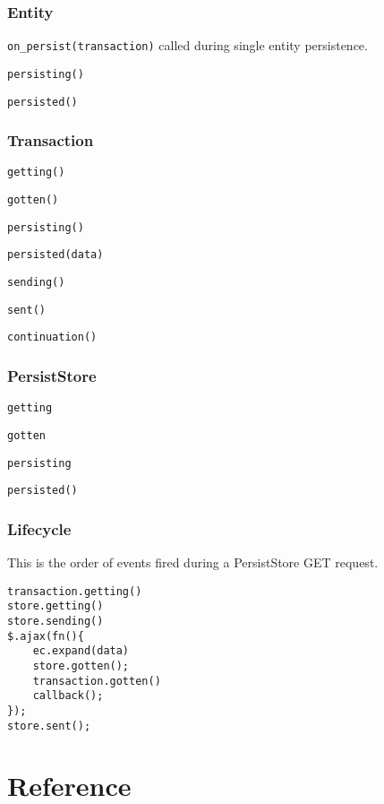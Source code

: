\documentclass{article}
\newcommand{\ilcode}{\tt}
\begin{document}
\subsubsection{Entity}
{\ilcode on\_persist(transaction)} called during single entity persistence.

{\ilcode persisting()}

{\ilcode persisted()}

\subsubsection{Transaction}
{\ilcode getting()}

{\ilcode gotten()}

{\ilcode persisting()}

{\ilcode persisted(data)}

{\ilcode sending()}

{\ilcode sent()}

{\ilcode continuation()}

\subsubsection{PersistStore}
{\ilcode getting}

{\ilcode gotten}

{\ilcode persisting}

{\ilcode persisted()}

\subsubsection{Lifecycle}
This is the order of events fired during a PersistStore GET request.
\linespread{1}
\begin{lstlisting}
transaction.getting()
store.getting()
store.sending()
$.ajax(fn(){
	ec.expand(data)
	store.gotten();
	transaction.gotten()
	callback();
});
store.sent();
\end{lstlisting}

\section{Reference}
\end{document}
